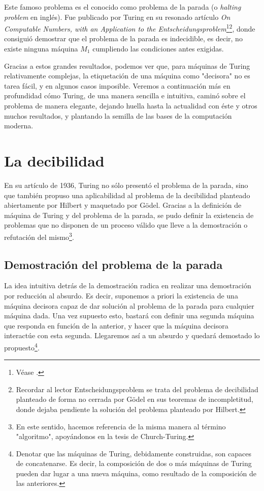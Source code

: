 Este famoso problema es el conocido como problema de la parada (o \textit{halting problem} en inglés). Fue publicado por Turing en su resonado artículo \textit{On Computable Numbers, with an Application to the 
Entscheidungsproblem}\footnote{Véase \cite{turing1936computable}.}\footnote{Recordar al lector Entscheidungsproblem se trata del problema de decibilidad planteado de forma no cerrada por Gödel en sus teoremas de incompletitud, 
donde dejaba pendiente la solución del problema planteado por Hilbert.}, donde consiguió demostrar que el problema de la parada es indecidible, es decir, no existe ninguna máquina $M_1$ cumpliendo las condiciones antes 
exigidas.

Gracias a estos grandes resultados, podemos ver que, para máquinas de Turing relativamente complejas, la etiquetación de una máquina como "decisora" no es tarea fácil, y en algunos casos imposible. Veremos a continuación 
más en profundidad cómo Turing, de una manera sencilla e intuitiva, caminó sobre el problema de manera elegante, dejando huella hasta la actualidad con éste y otros muchos resultados, y plantando la semilla de las bases de 
la computación moderna.



\section{La decibilidad}

En su artículo de 1936, Turing no sólo presentó el problema de la parada, sino que también propuso una aplicabilidad al problema de la decibilidad planteado abiertamente por Hilbert y maquetado por Gödel. Gracias a la 
definición de máquina de Turing y del problema de la parada, se pudo definir la existencia de problemas que no disponen de un proceso válido que lleve a la demostración o refutación del mismo\footnote{En este sentido, 
hacemos referencia de la misma manera al término "algoritmo", apoyándonos en la tesis de Church-Turing.}.

\subsection{Demostración del problema de la parada}

La idea intuitiva detrás de la demostración radica en realizar una demostración por reducción al absurdo. Es decir, suponemos a priori la existencia de una máquina decisora capaz de dar solución al problema de la parada para
cualquier máquina dada. Una vez supuesto esto, bastará con definir una segunda máquina que responda en función de la anterior, y hacer que la máquina decisora interactúe con esta segunda. Llegaremos así a un absurdo y quedará
demostado lo propuesto\footnote{Denotar que las máquinas de Turing, debidamente construidas, son capaces de concatenarse. Es decir, la composición de dos o más máquinas de Turing pueden dar lugar a una nueva máquina, como resultado
de la composición de las anteriores.}.

